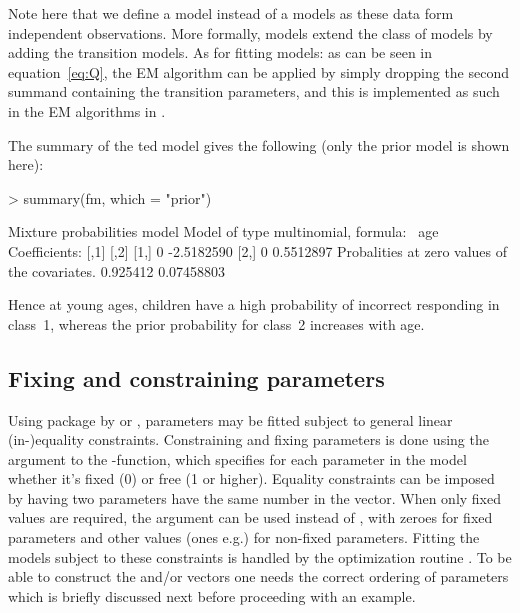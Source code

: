 \documentclass[article]{jss}
\begin{document}
Note here that we define a  model instead of a 
models as these data form independent observations.  More formally,
 models extend the class of  models by adding
the transition models.  As for fitting  models: as can be
seen in equation~\ref{eq:Q}, the EM algorithm can be applied by simply
dropping the second summand containing the transition parameters, and 
this is implemented as such in the EM algorithms in .

The summary of the ted model gives the following (only the
prior model is shown here):
\begin{Schunk}
\begin{Sinput}
> summary(fm, which = "prior")
\end{Sinput}
\begin{Soutput}
Mixture probabilities model 
Model of type multinomial, formula: ~age
Coefficients: 
     [,1]       [,2]
[1,]    0 -2.5182590
[2,]    0  0.5512897
Probalities at zero values of the covariates.
0.925412 0.07458803 
\end{Soutput}
\end{Schunk}

%
%

Hence at young ages, children have a high probability of incorrect 
responding in class~1, whereas the prior probability for class~2 
increases with age. 


\subsection{Fixing and constraining parameters}

Using package  by \citet{Tamura2009} or 
\citet{ZZZZ???}, parameters may be fitted subject to general linear
(in-)equality constraints.  Constraining and fixing parameters is done
using the  argument to the -function, which
specifies for each parameter in the model whether it's fixed (0) or
free (1 or higher).  Equality constraints can be imposed by having two
parameters have the same number in the  vector.  When
only fixed values are required, the  argument can be used
instead of , with zeroes for fixed parameters and other
values (ones e.g.) for non-fixed parameters.  Fitting the models
subject to these constraints is handled by the optimization routine
.  To be able to construct the  and/or
 vectors one needs the correct ordering of parameters
which is briefly discussed next before proceeding with an example.
\end{document}
